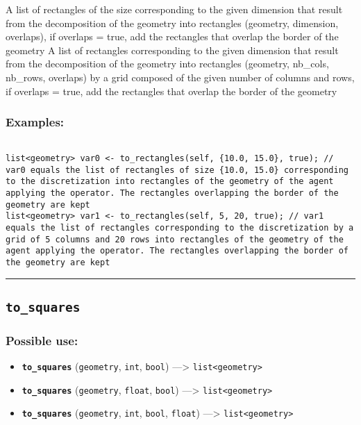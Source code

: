 \documentclass[]{book}
\providecommand{\tightlist}{%
  \setlength{\itemsep}{0pt}\setlength{\parskip}{0pt}}
\theoremstyle{definition}
\theoremstyle{definition}
\theoremstyle{definition}
\theoremstyle{remark}
\begin{document}
A list of rectangles of the size corresponding to the given dimension
that result from the decomposition of the geometry into rectangles
(geometry, dimension, overlaps), if overlaps = true, add the rectangles
that overlap the border of the geometry A list of rectangles
corresponding to the given dimension that result from the decomposition
of the geometry into rectangles (geometry, nb\_cols, nb\_rows, overlaps)
by a grid composed of the given number of columns and rows, if overlaps
= true, add the rectangles that overlap the border of the geometry

\subsubsection{Examples:}\label{examples-360}

\begin{verbatim}
 
list<geometry> var0 <- to_rectangles(self, {10.0, 15.0}, true); // var0 equals the list of rectangles of size {10.0, 15.0} corresponding to the discretization into rectangles of the geometry of the agent applying the operator. The rectangles overlapping the border of the geometry are kept 
list<geometry> var1 <- to_rectangles(self, 5, 20, true); // var1 equals the list of rectangles corresponding to the discretization by a grid of 5 columns and 20 rows into rectangles of the geometry of the agent applying the operator. The rectangles overlapping the border of the geometry are kept
\end{verbatim}

\begin{center}\rule{0.5\linewidth}{\linethickness}\end{center}

\subsection{\texorpdfstring{\texttt{to\_squares}}{to\_squares}}\label{to_squares}

\subsubsection{Possible use:}\label{possible-use-523}

\begin{itemize}
\tightlist
\item
  \textbf{\texttt{to\_squares}} (\texttt{geometry}, \texttt{int},
  \texttt{bool}) ---\textgreater{}
  \texttt{list\textless{}geometry\textgreater{}}
\item
  \textbf{\texttt{to\_squares}} (\texttt{geometry}, \texttt{float},
  \texttt{bool}) ---\textgreater{}
  \texttt{list\textless{}geometry\textgreater{}}
\item
  \textbf{\texttt{to\_squares}} (\texttt{geometry}, \texttt{int},
  \texttt{bool}, \texttt{float}) ---\textgreater{}
  \texttt{list\textless{}geometry\textgreater{}}
\end{itemize}
\end{document}
